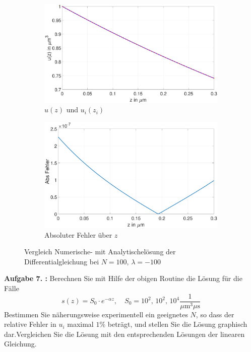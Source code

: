  \begin{figure}[h]
	\begin{subfigure}[b]{0.5\textwidth}
		\includegraphics[width=\textwidth]{figures/station_gl_2_2/test_n100_l1}
		\caption{$u(z)$ und $u_{i}(z_i)$}
	\end{subfigure}
	\hfill
	\begin{subfigure}[b]{0.5\textwidth}
		\includegraphics[width=1\linewidth]{figures/station_gl_2_2/test_n100_l1_fehler}
		\caption{Absoluter Fehler über $z$}
	\end{subfigure}
	\caption{Vergleich Numerische- mit Analytischelösung der Differentialgleichung bei $N=100,\,\lambda=-100$}
\end{figure}
\begin{mybox}
	\textbf{Aufgabe 7. :}	Berechnen Sie mit Hilfe der obigen Routine die
	Lösung für die Fälle
	\begin{equation}
		s(z)=S_0\cdot e^{-\alpha z}, \quad S_0=10^2, \, 10^2, \, 10^4
		\frac{1}{\si{\mu\meter^3 \mu \s}}
	\end{equation}
	Bestimmen Sie näherungsweise experimentell ein geeignetes $N$, so dass
	der relative Fehler in $u_i$
	maximal $1\%$ beträgt, und stellen Sie die Lösung graphisch
	dar.Vergleichen Sie die Lösung mit den
	entsprechenden Lösungen der linearen Gleichung.
\end{mybox}
